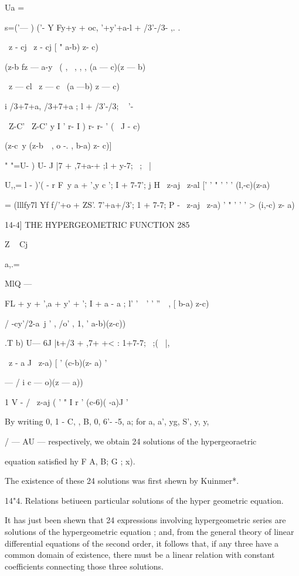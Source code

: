 Ua = 



 s=('— ) ('- Y Fy+y + oc, '+y'+a-l + /3'-/3- ,.  . 

\ z - cj \ z - cj [ "   a-b) z- c) 

(z-b fz — a-y \  (  , \  , ,    , (a — c)(z — b) 

\ z — cl \ z — c \ (a —b) z — c) 

i /3+7+a, /3+7+a ; l + /3'-/3; ~ '-\ 

\ Z-C' \ Z-C' y  I ' r- I ) r- r- ' (   \  J   - c)\ 

(z-c\ y (z-b\ \        , o -. ,  b-a) z- c)] 

" "=U- ) U- J  |7   +  ,7+a-+ ;l + y-7;  \  ;  \   | 

U,,= l - )'( - r F\ y a +  ',y c  '; I + 7-7';  j  H 
\ z-aj \ z-al ['   ' "    ' ' ' (l,-c)(z-a)\ 

   = (lllfy7l Yf f/'+o + ZS'. 7'+a+/3'; 1 + 7-7; P -  
\ z-aj \ z-a)  ' "  '   ' ' > (i,-c) z- a) 



14-4] THE HYPERGEOMETRIC FUNCTION 285 



Z ~ Cj 



a,.= 



MlQ — 



FL + y +  ',a + y' +  '; I + a - a ;  l' '\ \ ' ' ''\ \ , 
[  b-a) z-c)  

/ -cy'/2-a\  j ' , /o' , 1, '  a-b)(z-c)) 

.T b) U— 6J  |t+/3 +  ,7+ +< : 1+7-7;   \  ;( \   |, 

\ z - a J \ z-a) [ ' (c-b)(z- a)  ' 

—  / i  c — o)(z — a)) 

1  V - / \ z-aj ( ' "  I   r ' (c-6)( -a)J ' 

By writing 0, 1 - C,  , B, 0, 6'-  -5, a; for a, a', yg,  S', y, y, 

/ — AU —   respectively, we obtain 24 solutions of the hypergeoraetric 

equation satisfied hy F  A, B; G ; x). 

The existence of these 24 solutions was first shewn by Kuinmer*. 

14"4. Relations betiueen particular solutions of the hyper geometric equation. 

It has just been shewn that 24 expressions involving hypergeometric 
series are solutions of the hypergeometric equation ; and, from the general 
theory of linear differential equations of the second order, it follows that, if 
any three have a common domain of existence, there must be a linear relation 
with constant coefficients connecting those three solutions. 

